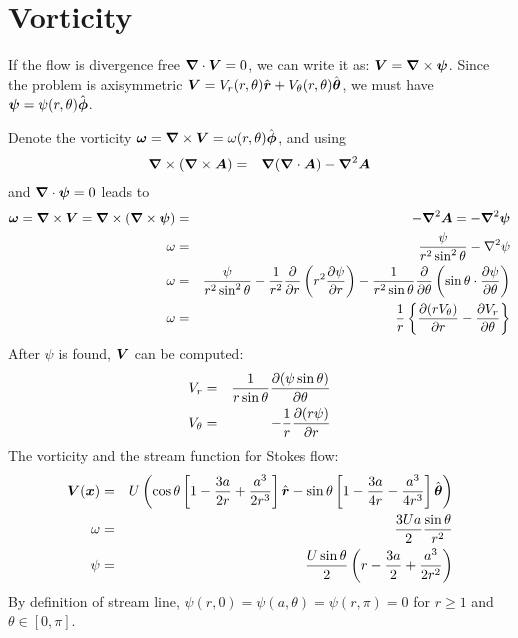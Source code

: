 \documentclass[11pt]{article}
\begin{document}
\section{Vorticity}
If the flow is divergence free $\boldsymbol{\nabla} \cdot \boldsymbol{V} = 0$,
we can write it as: $\boldsymbol{V} = \boldsymbol{\nabla} \times \boldsymbol{\psi}$.
Since the problem is axisymmetric
$\boldsymbol{V} = V_r(r,\theta)\hat{\boldsymbol{r}} + V_\theta(r,\theta)\hat{\boldsymbol{\theta}}$,
we must have $\boldsymbol{\psi} = \psi(r,\theta) \hat{\boldsymbol{\phi}}$.

Denote the vorticity $\boldsymbol{\omega} = \boldsymbol{\nabla} \times \boldsymbol{V} =
\omega(r, \theta) \hat{\boldsymbol{\phi}}$,
and using
\begin{eqnarray}
  \boldsymbol{\nabla} \times (\boldsymbol{\nabla} \times \boldsymbol{A}) &=&
  \boldsymbol{\nabla} (\boldsymbol{\nabla} \cdot \boldsymbol{A}) - \boldsymbol{\nabla}^2 \boldsymbol{A}
\end{eqnarray}
and $\boldsymbol{\nabla} \cdot \boldsymbol{\psi} = 0$ leads to
\begin{eqnarray}
  \boldsymbol{\omega} = \boldsymbol{\nabla} \times \boldsymbol{V} = \boldsymbol{\nabla} \times (\boldsymbol{\nabla} \times \boldsymbol{\psi}) &=& - \boldsymbol{\nabla}^2 \boldsymbol{A} = - \boldsymbol{\nabla}^2 \boldsymbol{\psi} \\
  \omega &=& \frac{\psi}{r^2 \sin^2\theta} - \nabla^2 \psi \\
  \omega &=& \frac{\psi}{r^2 \sin^2\theta} - \frac{1}{r^2}\frac{\partial }{\partial r} \left( r^2 \frac{\partial \psi}{\partial r} \right) - \frac{1}{r^2 \sin\theta} \frac{\partial }{\partial \theta}\left( \sin\theta \cdot \frac{\partial \psi}{\partial \theta}\right) \\
  \omega &=& \frac{1}{r}\left\{\frac{\partial (r V_\theta)}{\partial r} - \frac{\partial V_r}{\partial \theta}\right\}
\end{eqnarray}
After $\psi$ is found, $\boldsymbol{V}$ can be computed:
\begin{eqnarray}
  V_r &=& \frac{1}{r \sin\theta}\frac{\partial (\psi \sin\theta)}{\partial \theta} \\
  V_\theta &=& -\frac{1}{r}\frac{\partial (r \psi)}{\partial r}
\end{eqnarray}
The vorticity and the stream function for Stokes flow:
\begin{eqnarray}
\boldsymbol{V}(\boldsymbol{x}) &=& U \left(
\cos\theta \left[1 - \frac{3a}{2r} + \frac{a^3}{2r^3}\right] \hat{\boldsymbol{r}} -
\sin\theta \left[1 - \frac{3a}{4r} - \frac{a^3}{4r^3}\right] \hat{\boldsymbol{\theta}}
\right) \\
\omega &=& \frac{3 U a}{2} \frac{\sin\theta}{r^2} \\
\psi &=& \frac{U \sin\theta}{2} \left( r - \frac{3a}{2} + \frac{a^3}{2r^2} \right)
\end{eqnarray}
By definition of stream line, 
$\psi(r, 0) = \psi(a, \theta) = \psi(r, \pi) = 0$ 
for $r \ge 1$ and $\theta \in [0, \pi]$.
\end{document}
